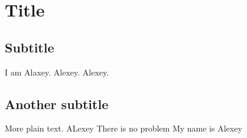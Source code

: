 \documentclass{article}
\begin{document}
\section{Title}

\subsection{Subtitle}
I am Alaxey. Alexey. Alexey.
\subsection{Another subtitle}

More plain text. ALexey
There is no problem My name is Alexey
\end{document}

